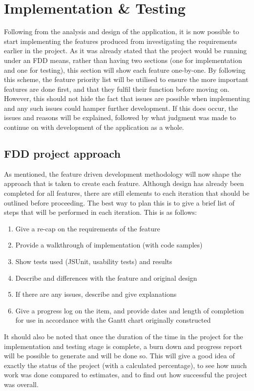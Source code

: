 \chapter{Implementation \& Testing}
Following from the analysis and design of the application, it is now possible to start implementing the features produced from investigating the requirements earlier in the project. As it was already stated that the project would be running under an FDD means, rather than having two sections (one for implementation and one for testing), this section will show each feature one-by-one. By following this scheme, the feature priority list will be utilised to ensure the more important features are done first, and that they fulfil their function before moving on. However, this should not hide the fact that issues are possible when implementing and any such issues could hamper further development. If this does occur, the issues and reasons will be explained, followed by what judgment was made to continue on with development of the application as a whole.

\section{FDD project approach}
As mentioned, the feature driven development methodology will now shape the approach that is taken to create each feature. Although design has already been completed for all features, there are still elements to each iteration that should be outlined before proceeding. The best way to plan this is to give a brief list of steps that will be performed in each iteration. This is as follows:

\begin{enumerate}
\item Give a re-cap on the requirements of the feature
\item Provide a walkthrough of implementation (with code samples)
\item Show tests used (JSUnit, usability tests) and results
\item Describe and differences with the feature and original design
\item If there are any issues, describe and give explanations
\item Give a progress log on the item, and provide dates and length of completion for use in accordance with the Gantt chart originally constructed
\end{enumerate}

It should also be noted that once the duration of the time in the project for the implementation and testing stage is complete, a burn down and progress report will be possible to generate and will be done so. This will give a good idea of exactly the status of the project (with a calculated percentage), to see how much work was done compared to estimates, and to find out how successful the project was overall. 

